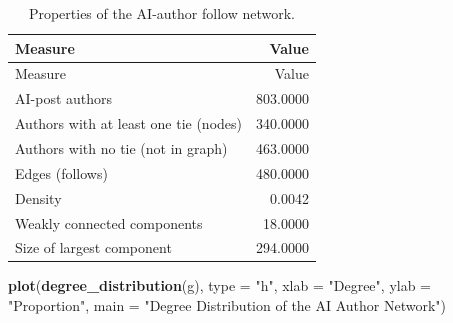 \documentclass[
  10pt,
]{article}
\newenvironment{Shaded}{\begin{snugshade}}{\end{snugshade}}
\newcommand{\AttributeTok}[1]{\textcolor[rgb]{0.13,0.29,0.53}{#1}}
\newcommand{\DecValTok}[1]{\textcolor[rgb]{0.00,0.00,0.81}{#1}}
\newcommand{\FunctionTok}[1]{\textcolor[rgb]{0.13,0.29,0.53}{\textbf{#1}}}
\newcommand{\NormalTok}[1]{#1}
\newcommand{\OtherTok}[1]{\textcolor[rgb]{0.56,0.35,0.01}{#1}}
\newcommand{\SpecialCharTok}[1]{\textcolor[rgb]{0.81,0.36,0.00}{\textbf{#1}}}
\newcommand{\StringTok}[1]{\textcolor[rgb]{0.31,0.60,0.02}{#1}}
\begin{document}
\begin{Shaded}
\end{Shaded}

\begin{longtable}[]{@{}lr@{}}
\caption{Properties of the AI-author follow network.}\tabularnewline
\toprule\noalign{}
Measure & Value \\
\midrule\noalign{}
\endfirsthead
\toprule\noalign{}
Measure & Value \\
\midrule\noalign{}
\endhead
\bottomrule\noalign{}
\endlastfoot
AI-post authors & 803.0000 \\
Authors with at least one tie (nodes) & 340.0000 \\
Authors with no tie (not in graph) & 463.0000 \\
Edges (follows) & 480.0000 \\
Density & 0.0042 \\
Weakly connected components & 18.0000 \\
Size of largest component & 294.0000 \\
\end{longtable}

\begin{Shaded}
\begin{Highlighting}[]
\FunctionTok{plot}\NormalTok{(}\FunctionTok{degree\_distribution}\NormalTok{(g), }\AttributeTok{type =} \StringTok{"h"}\NormalTok{, }\AttributeTok{xlab =} \StringTok{"Degree"}\NormalTok{, }\AttributeTok{ylab =} \StringTok{"Proportion"}\NormalTok{,}
     \AttributeTok{main =} \StringTok{"Degree Distribution of the AI Author Network"}\NormalTok{)}
\end{Highlighting}
\end{Shaded}
\end{document}
